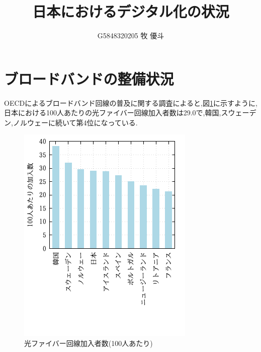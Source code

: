 \documentclass[a4paper,11pt,dvipdfmx]{ujarticle}
\title{日本におけるデジタル化の状況}
\author{G5848320205 牧 優斗}
\begin{document}
\maketitle %

\section{ブロードバンドの整備状況}


OECDによるブロードバンド回線の普及に関する調査\cite{oecd}によると,図\ref{fig:加入率}に示すように,日本における100人あたりの光ファイバー回線加入者数は29.0で,韓国,スウェーデン,ノルウェーに続いて第4位になっている.



\begin{figure}[htbp]
\includegraphics{fig11.png}
\centering
\caption{光ファイバー回線加入者数(100人あたり)}\label{fig:加入率}
\end{figure}
\end{document}
